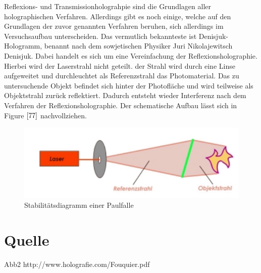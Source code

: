 \documentclass[12pt,a4paper]{article}
\begin{document}
Reflexions- und Transmissionholograhpie sind die Grundlagen aller holographischen Verfahren. Allerdings gibt es noch einige, welche auf den Grundlagen der zuvor genannten Verfahren beruhen, sich allerdings im Versuchsaufbau unterscheiden. Das vermutlich bekannteste ist Denisjuk-Hologramm, benannt nach dem sowjetischen Physiker Juri Nikolajewitsch Denisjuk. Dabei handelt es sich um eine Vereinfachung der Reflexionsholographie. Hierbei wird der Laserstrahl nicht geteilt. der Strahl wird durch eine Linse aufgeweitet und durchleuchtet als Referenzstrahl das Photomaterial. Das zu untersuchende Objekt befindet sich hinter der Photofläche und wird teilweise als Objektstrahl zurück reflektiert. Dadurch entsteht wieder Interferenz nach dem Verfahren der Reflexionsholographie. Der schematische Aufbau lässt sich in Figure $\ref{77}$ nachvollziehen.

\begin{figure}[h]
	\includegraphics[scale = 0.5]{denis.png}
	\centering
	\caption{Stabilitätsdiagramm einer Paulfalle}
	\label{77}
\end{figure}
\section{Quelle}

Abb2 http://www.holografie.com/Fouquier.pdf
\end{document}
